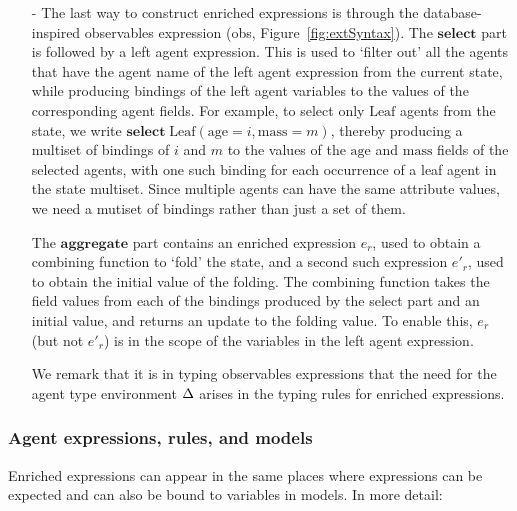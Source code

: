 \begin{itemize}
\item[-]
  The last way to construct enriched expressions is through the
  database-inspired observables expression (\textsf{obs},
  Figure~\ref{fig:extSyntax}). The $\mathbf{select}$ part is followed by a left
  agent expression. This is used to `filter out' all the agents that have the
  agent name of the left agent expression from the current state, while
  producing bindings of the left agent variables to the values of the
  corresponding agent fields. For example, to select only $\mathrm{Leaf}$ agents
  from the state, we write
  $\mathbf{select} \; \mathrm{Leaf}(\mathrm{age} = i, \mathrm{mass} = m)$,
  thereby producing a multiset of bindings of $i$ and $m$ to the values of the
  $\mathrm{age}$ and $\mathrm{mass}$ fields of the selected agents, with one
  such binding for each occurrence of a leaf agent in the state multiset.  Since
  multiple agents can have the same attribute values, we need a mutiset of
  bindings rather than just a set of them.

  The $\mathbf{aggregate}$ part contains an enriched expression $e_r$, used to
  obtain a combining function to `fold' the state, and a second such expression
  $e'_r$, used to obtain the initial value of the folding. The combining function
  takes the field values from each of the bindings produced by the select part
  and an initial value, and returns an update to the folding value. To enable
  this, $e_r$ (but not $e'_r$) is in the scope of the variables %
  in the left agent expression.

  We remark that it is in typing observables expressions that the need for the
  agent type environment $\Delta$ arises in the typing rules for enriched
  expressions.

\end{itemize}


\subsubsection*{Agent expressions, rules, and models}
Enriched expressions can appear in the same places where expressions can be expected and can also be bound  to variables in models. In more detail:

